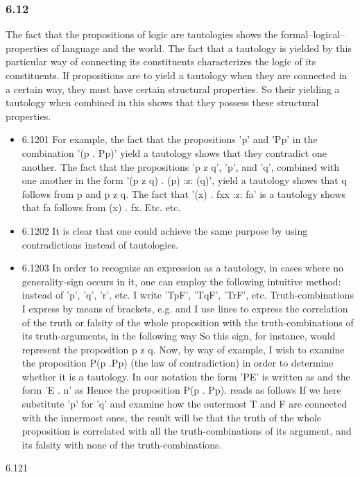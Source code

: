 \documentclass[11pt]{article}
\begin{document}
\subsubsection*{6.12}
\label{sec:org79bd371}
The fact that the propositions of logic are tautologies shows the
formal--logical--properties of language and the world. The fact that a
tautology is yielded by this particular way of connecting its constituents
characterizes the logic of its constituents. If propositions are to yield a
tautology when they are connected in a certain way, they must have certain
structural properties. So their yielding a tautology when combined in this
shows that they possess these structural properties.
\begin{itemize}
\item 6.1201
\label{sec:orga816787}
For example, the fact that the propositions 'p' and 'Pp' in the
combination '(p . Pp)' yield a tautology shows that they contradict one
another. The fact that the propositions 'p z q', 'p', and 'q', combined
with one another in the form '(p z q) . (p) :z: (q)', yield a tautology
shows that q follows from p and p z q. The fact that '(x) . fxx :z: fa' is
a tautology shows that fa follows from (x) . fx. Etc. etc.
\item 6.1202
\label{sec:org70772a9}
It is clear that one could achieve the same purpose by using
contradictions instead of tautologies.
\item 6.1203
\label{sec:org1d39e14}
In order to recognize an expression as a tautology, in cases where
no generality-sign occurs in it, one can employ the following intuitive
method: instead of 'p', 'q', 'r', etc. I write 'TpF', 'TqF', 'TrF', etc.
Truth-combinations I express by means of brackets, e.g. and I use lines to
express the correlation of the truth or falsity of the whole proposition
with the truth-combinations of its truth-arguments, in the following way So
this sign, for instance, would represent the proposition p z q. Now, by way
of example, I wish to examine the proposition P(p .Pp) (the law of
contradiction) in order to determine whether it is a tautology. In our
notation the form 'PE' is written as and the form 'E . n' as Hence the
proposition P(p . Pp). reads as follows If we here substitute 'p' for 'q'
and examine how the outermost T and F are connected with the innermost
ones, the result will be that the truth of the whole proposition is
correlated with all the truth-combinations of its argument, and its falsity
with none of the truth-combinations.
\end{itemize}
\item 6.121
\end{document}

